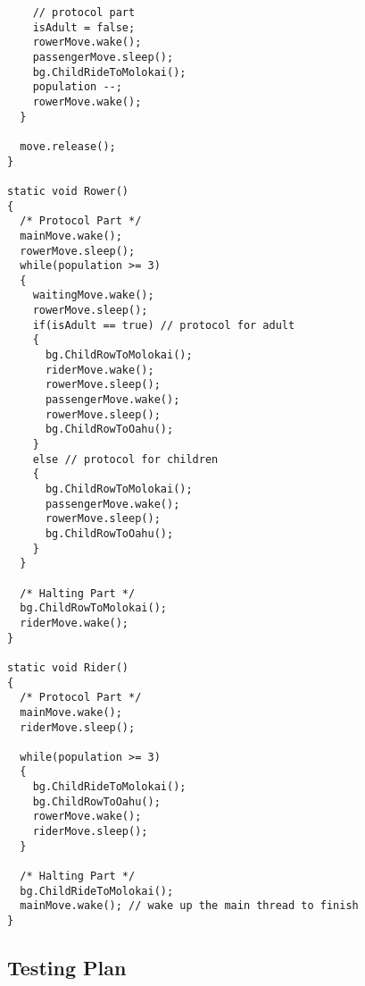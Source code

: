 \documentclass{article}
\begin{document}
\begin{spacing}{1.1}
\begin{lstlisting}
    // protocol part
    isAdult = false;
    rowerMove.wake();
    passengerMove.sleep();
    bg.ChildRideToMolokai();
    population --;
    rowerMove.wake();
  }

  move.release();
}

static void Rower()
{
  /* Protocol Part */
  mainMove.wake();
  rowerMove.sleep();
  while(population >= 3)
  {
    waitingMove.wake();
    rowerMove.sleep();
    if(isAdult == true) // protocol for adult
    {
      bg.ChildRowToMolokai();
      riderMove.wake();
      rowerMove.sleep();
      passengerMove.wake();
      rowerMove.sleep();
      bg.ChildRowToOahu();
    }
    else // protocol for children
    {
      bg.ChildRowToMolokai();
      passengerMove.wake();
      rowerMove.sleep();
      bg.ChildRowToOahu();
    }
  }

  /* Halting Part */
  bg.ChildRowToMolokai();
  riderMove.wake();
}

static void Rider()
{
  /* Protocol Part */
  mainMove.wake();
  riderMove.sleep();

  while(population >= 3)
  {
    bg.ChildRideToMolokai();
    bg.ChildRowToOahu();
    rowerMove.wake();
    riderMove.sleep();
  }

  /* Halting Part */
  bg.ChildRideToMolokai();
  mainMove.wake(); // wake up the main thread to finish
}
\end{lstlisting}

\subsection{Testing Plan}

\end{spacing}
\end{document}
